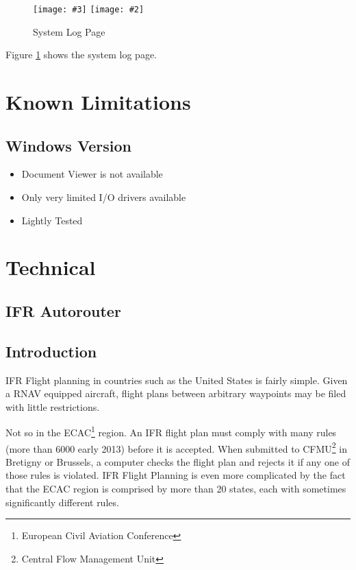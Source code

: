\documentclass[a4paper,10pt,pdftex]{article}
\newcommand{\jnxfig}[3][]{\ifmypdf\texttt{[image: \#3]}
  \else\texttt{[image: \#2]}\fi}
\begin{document}
\begin{figure}[!htbp]
  \begin{center}
    \jnxfig[scale=0.5]{logpage.eps}{logpage.png}
    \caption{System Log Page}
    \label{fig:logpage}
  \end{center}
\end{figure}

Figure \ref{fig:logpage} shows the system log page.



\raggedright



\appendix
\section{Known Limitations}

\subsection{Windows Version}

\begin{itemize}
\item Document Viewer is not available
\item Only very limited I/O drivers available
\item Lightly Tested
\end{itemize}


\section{Technical}

\subsection{IFR Autorouter}

\subsection{Introduction}

IFR Flight planning in countries such as the United States is fairly
simple. Given a RNAV equipped aircraft, flight plans between arbitrary
waypoints may be filed with little restrictions.

Not so in the ECAC\footnote{European Civil Aviation Conference}
region. An IFR flight plan must comply with many rules (more than 6000
early 2013) before it is accepted. When submitted to
CFMU\footnote{Central Flow Management Unit} in Bretigny or Brussels, a
computer checks the flight plan and rejects it if any one of those
rules is violated. IFR Flight Planning is even more complicated by the
fact that the ECAC region is comprised by more than 20 states, each
with sometimes significantly different rules.
\end{document}
